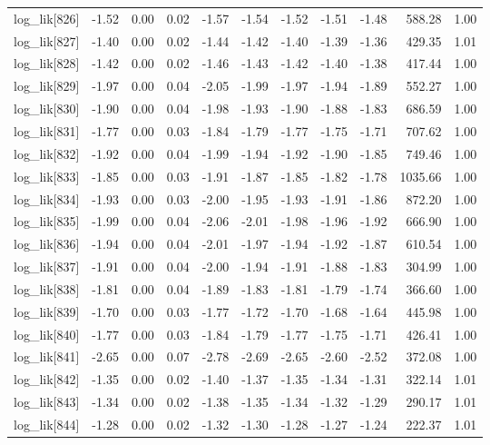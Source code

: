 \begin{table}[ht]
\begin{tabular}{rrrrrrrrrrr}
  log\_lik[826] & -1.52 & 0.00 & 0.02 & -1.57 & -1.54 & -1.52 & -1.51 & -1.48 & 588.28 & 1.00 \\ 
  log\_lik[827] & -1.40 & 0.00 & 0.02 & -1.44 & -1.42 & -1.40 & -1.39 & -1.36 & 429.35 & 1.01 \\ 
  log\_lik[828] & -1.42 & 0.00 & 0.02 & -1.46 & -1.43 & -1.42 & -1.40 & -1.38 & 417.44 & 1.00 \\ 
  log\_lik[829] & -1.97 & 0.00 & 0.04 & -2.05 & -1.99 & -1.97 & -1.94 & -1.89 & 552.27 & 1.00 \\ 
  log\_lik[830] & -1.90 & 0.00 & 0.04 & -1.98 & -1.93 & -1.90 & -1.88 & -1.83 & 686.59 & 1.00 \\ 
  log\_lik[831] & -1.77 & 0.00 & 0.03 & -1.84 & -1.79 & -1.77 & -1.75 & -1.71 & 707.62 & 1.00 \\ 
  log\_lik[832] & -1.92 & 0.00 & 0.04 & -1.99 & -1.94 & -1.92 & -1.90 & -1.85 & 749.46 & 1.00 \\ 
  log\_lik[833] & -1.85 & 0.00 & 0.03 & -1.91 & -1.87 & -1.85 & -1.82 & -1.78 & 1035.66 & 1.00 \\ 
  log\_lik[834] & -1.93 & 0.00 & 0.03 & -2.00 & -1.95 & -1.93 & -1.91 & -1.86 & 872.20 & 1.00 \\ 
  log\_lik[835] & -1.99 & 0.00 & 0.04 & -2.06 & -2.01 & -1.98 & -1.96 & -1.92 & 666.90 & 1.00 \\ 
  log\_lik[836] & -1.94 & 0.00 & 0.04 & -2.01 & -1.97 & -1.94 & -1.92 & -1.87 & 610.54 & 1.00 \\ 
  log\_lik[837] & -1.91 & 0.00 & 0.04 & -2.00 & -1.94 & -1.91 & -1.88 & -1.83 & 304.99 & 1.00 \\ 
  log\_lik[838] & -1.81 & 0.00 & 0.04 & -1.89 & -1.83 & -1.81 & -1.79 & -1.74 & 366.60 & 1.00 \\ 
  log\_lik[839] & -1.70 & 0.00 & 0.03 & -1.77 & -1.72 & -1.70 & -1.68 & -1.64 & 445.98 & 1.00 \\ 
  log\_lik[840] & -1.77 & 0.00 & 0.03 & -1.84 & -1.79 & -1.77 & -1.75 & -1.71 & 426.41 & 1.00 \\ 
  log\_lik[841] & -2.65 & 0.00 & 0.07 & -2.78 & -2.69 & -2.65 & -2.60 & -2.52 & 372.08 & 1.00 \\ 
  log\_lik[842] & -1.35 & 0.00 & 0.02 & -1.40 & -1.37 & -1.35 & -1.34 & -1.31 & 322.14 & 1.01 \\ 
  log\_lik[843] & -1.34 & 0.00 & 0.02 & -1.38 & -1.35 & -1.34 & -1.32 & -1.29 & 290.17 & 1.01 \\ 
  log\_lik[844] & -1.28 & 0.00 & 0.02 & -1.32 & -1.30 & -1.28 & -1.27 & -1.24 & 222.37 & 1.01 \\ 

\end{tabular}
\end{table}
